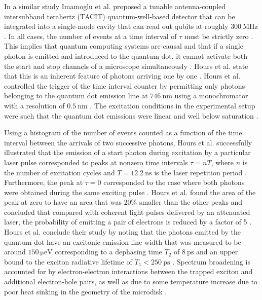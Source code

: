 In a similar study Imamoglu et al. proposed a tunable antenna-coupled intersubband terahertz (TACIT) quantum-well-based detector that can be integrated into a single-mode cavity that can read out qubits at roughly $\SI{300}{\mega\hertz}$ \cite{sherwin1999quantum}. In all cases, the number of events at a time interval of $\tau$ must be strictly zero \cite{hours2003single}. This implies that quantum computing systems are causal and that if a single photon is emitted and introduced to the quantum dot, it cannot activate both the start and stop channels of a microscope simultaneously \cite{hours2003single}. Hours et al. state that this is an inherent feature of photons arriving one by one \cite{hours2003single}. Hours et al. controlled the trigger of the time interval counter by permitting only photons belonging to the quantum dot emission line at $\SI{746}{\nano\meter}$ using a monochromator with a resolution of $\SI{0.5}{\nano\meter}$ \cite{hours2003single}. The excitation conditions in the experimental setup were such that the quantum dot emissions were linear and well below saturation \cite{hours2003single}. 

Using a histogram of the number of events counted as a function of the time interval between the arrivals of two successive photons, Hours et al. successfully illustrated that the emission of a start photon during excitation by a particular laser pulse corresponded to peaks at nonzero time intervals $\tau = nT$, where $n$ is the number of excitation cycles and $T = \SI{12.2}{\nano\second}$ is the laser repetition period \cite{hours2003single}. Furthermore, the peak at $\tau = 0$ corresponded to the case where both photons were obtained during the same exciting pulse \cite{hours2003single}. Hours et al. found the area of the peak at zero to have an area that was $20\%$ smaller than the other peaks and concluded that compared with coherent light pulses delivered by an attenuated laser, the probability of emitting a pair of electrons is reduced by a factor of 5 \cite{hours2003single}. Hours et al. conclude their study by noting that the photons emitted by the quantum dot have an excitonic emission line-width that was measured to be around $\SI{150}{\micro\electronvolt}$ corresponding to a dephasing time $T_2$ of $\SI{8}{\pico\second}$ and an upper bound to the exciton radiative lifetime of $T_1 < \SI{250}{\pico\second}$ \cite{hours2003single}. Spectrum broadening is accounted for by electron-electron interactions between the trapped exciton and additional electron-hole pairs, as well as due to some temperature increase due to poor heat sinking in the geometry of the microdisk \cite{hours2003single}. 

